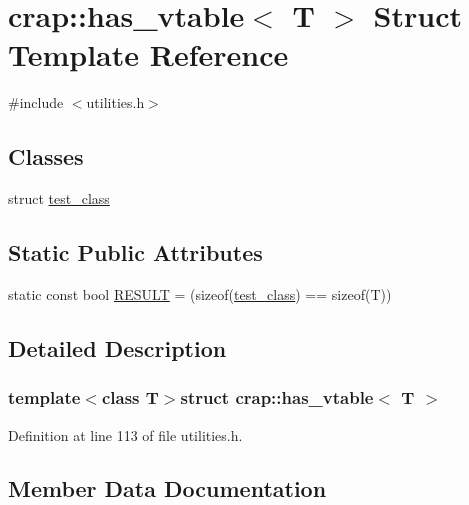 \hypertarget{structcrap_1_1has__vtable}{}\section{crap\+:\+:has\+\_\+vtable$<$ T $>$ Struct Template Reference}
\label{structcrap_1_1has__vtable}


{\ttfamily \#include $<$utilities.\+h$>$}

\subsection*{Classes}
\begin{DoxyCompactItemize}
\item 
struct \hyperlink{structcrap_1_1has__vtable_1_1test__class}{test\+\_\+class}
\end{DoxyCompactItemize}
\subsection*{Static Public Attributes}
\begin{DoxyCompactItemize}
\item 
static const bool \hyperlink{structcrap_1_1has__vtable_a020726388c42488ee23dc65f8e1b4b83}{R\+E\+S\+U\+L\+T} = (sizeof(\hyperlink{structcrap_1_1has__vtable_1_1test__class}{test\+\_\+class}) == sizeof(T))
\end{DoxyCompactItemize}


\subsection{Detailed Description}
\subsubsection*{template$<$class T$>$struct crap\+::has\+\_\+vtable$<$ T $>$}



Definition at line 113 of file utilities.\+h.



\subsection{Member Data Documentation}
\hypertarget{structcrap_1_1has__vtable_a020726388c42488ee23dc65f8e1b4b83}{}
